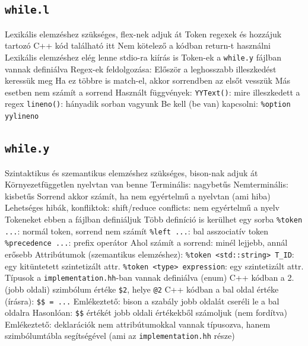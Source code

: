 \documentclass[12pt,a4paper]{article}
\begin{document}
\subsection{\texttt{while.l}}

\begin{outline}
	\1 Lexikális elemzéshez szükséges, flex-nek adjuk át
	\1 Token regexek és hozzájuk tartozó C++ kód található itt
		\2 Nem kötelező a kódban return-t használni
		\2 Lexikális elemzéshez elég lenne stdio-ra kiírás is
		\2 Token-ek a \texttt{while.y} fájlban vannak definiálva
	\1 Regex-ek feldolgozása:
		\2 Először a leghosszabb illeszkedést keressük meg
		\2 Ha ez többre is match-el, akkor sorrendben az elsőt vesszük
		\2 Más esetben nem számít a sorrend
	\1 Használt függvények:
		\2 \texttt{YYText()}: mire illeszkedett a regex
		\2 \texttt{lineno()}: hányadik sorban vagyunk
			\3 Be kell (be van) kapcsolni: \texttt{\%option yylineno}
\end{outline}

\pagebreak

\subsection{\texttt{while.y}}

\begin{outline}
	\1 Szintaktikus és szemantikus elemzéshez szükséges, bison-nak adjuk át
	\1 Környezetfüggetlen nyelvtan van benne
		\2 Terminális: nagybetűs
		\2 Nemterminális: kisbetűs
		\2 Sorrend akkor számít, ha nem egyértelmű a nyelvtan (ami hiba)
	\1 Lehetséges hibák, konfliktok:
		\2 shift/reduce conflicts: nem egyértelmű a nyelv
	\1 Tokeneket ebben a fájlban definiáljuk
		\2 Több definíció is kerülhet egy sorba
		\2 \texttt{\%token ...}: normál token, sorrend nem számít
		\2 \texttt{\%left ...}: bal asszociatív token
		\2 \texttt{\%precedence ...}: prefix operátor
		\2 Ahol számít a sorrend: minél lejjebb, annál erősebb
	\1 Attribútumok (szemantikus elemzéshez):
		\2 \texttt{\%token <std::string> T\_ID}: egy kitüntetett szintetizált attr.
		\2 \texttt{\%token <type> expression}: egy szintetizált attr.
			\3 Típusok a \texttt{implementation.hh}-ban vannak definiálva (enum)
		\2 C++ kódban a 2. (jobb oldali) szimbólum értéke \texttt{\$2}, helye \texttt{@2}
		\2 C++ kódban a bal oldal értéke (írásra): \texttt{\$\$ = ...}
	\1 Emlékeztető: bison a szabály jobb oldalát cseréli le a bal oldalra
		\2 Hasonlóan: \texttt{\$\$} értékét jobb oldali értékekből számoljuk (nem fordítva)
	\1 Emlékeztető: deklarációk nem attribútumokkal vannak típusozva,
	hanem szimbólumtábla segítségével (ami az \texttt{implementation.hh} része)
\end{outline}
\end{document}
